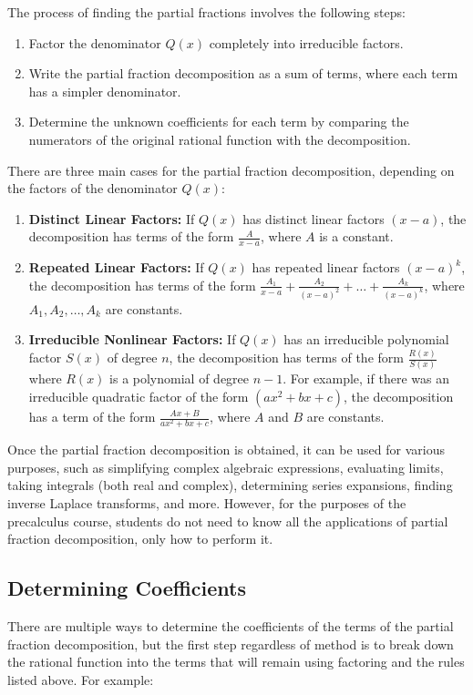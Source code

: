 \documentclass[11pt]{article}
\begin{document}
The process of finding the partial fractions involves the following steps:

\begin{enumerate}
  \item Factor the denominator $Q(x)$ completely into irreducible factors.
  \item Write the partial fraction decomposition as a sum of terms, where each term has a simpler denominator.
  \item Determine the unknown coefficients for each term by comparing the numerators of the original rational function with the decomposition.
\end{enumerate}

There are three main cases for the partial fraction decomposition, depending on the factors of the denominator $Q(x)$:

\begin{enumerate}
  \item \textbf{Distinct Linear Factors:} If $Q(x)$ has distinct linear factors $(x - a)$, the decomposition has terms of the form $\frac{A}{x - a}$, where $A$ is a constant.
  \item \textbf{Repeated Linear Factors:} If $Q(x)$ has repeated linear factors $(x - a)^k$, the decomposition has terms of the form $\frac{A_1}{x - a} + \frac{A_2}{(x - a)^2} + \ldots + \frac{A_k}{(x - a)^k}$, where $A_1, A_2, \ldots, A_k$ are constants.
  \item \textbf{Irreducible Nonlinear Factors:} If $Q(x)$ has an irreducible polynomial factor $S(x)$ of degree $n$, the decomposition has terms of the form $\frac{R(x)}{S(x)}$ where $R(x)$ is a polynomial of degree $n-1$. For example, if there was an irreducible quadratic factor of the form $(ax^2 + bx + c)$, the decomposition has a term of the form $\frac{Ax + B}{ax^2 + bx + c}$, where $A$ and $B$ are constants.
\end{enumerate}

Once the partial fraction decomposition is obtained, it can be used for various purposes, such as simplifying complex algebraic expressions, evaluating limits, taking integrals (both real and complex), determining series expansions, finding inverse Laplace transforms, and more. However, for the purposes of the precalculus course, students do not need to know all the applications of partial fraction decomposition, only how to perform it.

\subsection{Determining Coefficients}
There are multiple ways to determine the coefficients of the terms of the partial fraction decomposition, but the first step regardless of method is to break down the rational function into the terms that will remain using factoring and the rules listed above. For example:
\end{document}
